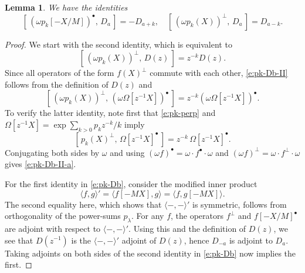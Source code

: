 \documentclass[12pt]{amsart}
\newtheorem{lemma}[thm]{Lemma}
\theoremstyle{definition}
\theoremstyle{remark}
\begin{document}
\begin{lemma}\label{lem:pk-Db} We have the identities
\begin{equation}\label{e:pk-Db}
[\, (\omega p_{k}[-X/M])^{\bullet },\, D_{a}\, ] = -D_{a+k},\quad [\,
(\omega p_{k}(X))^{\perp },\, D_{a}\, ] = D_{a-k}.
\end{equation}
\end{lemma}

\begin{proof}
We start with the second identity, which is equivalent to
\begin{equation}\label{e:pk-Db-II}
[\, (\omega p_{k}(X))^{\perp },\, D(z)\, ] = z^{-k}D(z).
\end{equation}
Since all operators of the form $f(X)^{\perp }$ commute with each
other, \eqref{e:pk-Db-II} follows from the definition of $D(z)$ and
\begin{equation}\label{e:pk-Db-II-a}
[\, (\omega p_{k}(X))^{\perp },\, (\omega \Omega [z^{-1}X])^{\bullet }
\,] = z^{-k} (\omega \Omega [z^{-1}X])^{\bullet }.
\end{equation}
To verify the latter identity, note first that \eqref{e:pk-perp} and
$\Omega [z^{-1}X] = \exp \sum _{k>0} p_{k} z^{-k}/k$ imply
\begin{equation}\label{e:pk-Db-II-b}
[\, p_{k}(X)^{\perp },\, \Omega [z^{-1}X]^{\bullet }\, ] = z^{-k} \,
\Omega [z^{-1}X]^{\bullet }.
\end{equation}
Conjugating both sides by $\omega $ and using $(\omega f)^{\bullet } =
\omega \cdot f^{\bullet }\cdot \omega $ and $(\omega f)^{\perp } =
\omega \cdot f^{\perp }\cdot \omega $ gives \eqref{e:pk-Db-II-a}.

For the first identity in \eqref{e:pk-Db}, consider the modified inner
product
\begin{equation}\label{e:M-inner}
\langle f,g \rangle' = \langle f[-MX],g \rangle = \langle
f,g[-MX] \rangle.
\end{equation}
The second equality here, which shows that $\langle -,- \rangle'$ is
symmetric, follows from orthogonality of the power-sums $p_{\lambda
}$.  For any $f$, the operators $f^{\perp }$ and $f[-X/M]^{\bullet }$
are adjoint with respect to $\langle -,- \rangle'$.  Using this and
the definition of $D(z)$, we see that $D(z^{-1})$ is the $\langle -,-
\rangle'$ adjoint of $D(z)$, hence $D_{-a}$ is adjoint to $D_{a}$.
Taking adjoints on both sides of the second identity in
\eqref{e:pk-Db} now implies the first.
\end{proof}
\end{document}
